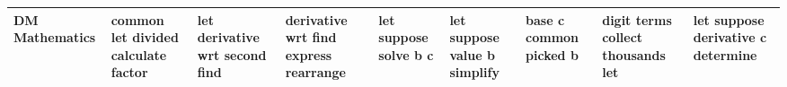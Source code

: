 \documentclass[11pt,a4paper]{article}
\begin{document}
\begin{appendices}
\begin{table}[htb]
\begin{tiny}
\begin{tabular}{|p{}|p{}|p{}|p{}|p{}|p{}|p{}|p{}|p{}|}
    DM Mathematics & common \newline let \newline divided \newline calculate \newline factor & let \newline derivative \newline wrt \newline second \newline find & derivative \newline wrt \newline find \newline express \newline rearrange & let \newline suppose \newline solve \newline b \newline c & let \newline suppose \newline value \newline b \newline simplify & base \newline c \newline common \newline picked \newline b & digit \newline terms \newline collect \newline thousands \newline let & let \newline suppose \newline derivative \newline c \newline determine\\\hline

\end{tabular}
\end{tiny}
\end{table}
\end{appendices}
\end{document}
